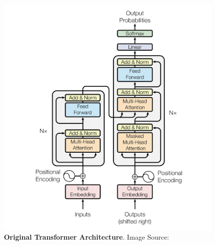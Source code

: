 \begin{figure}[!htbp]
    \begin{centering}
        \includegraphics{img/transformer}
        \caption[Original Transformer Architecture]{\textbf{Original Transformer Architecture}. Image Source: \cite{vaswani_attention_2017}}
        \label{fig:transformer}
    \end{centering}
\end{figure}

